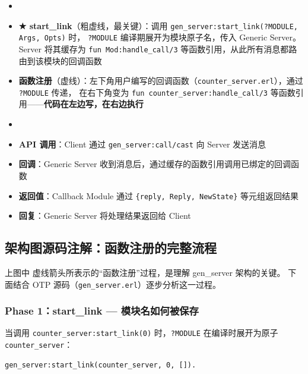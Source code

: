 \documentclass[a4paper,11pt]{article}
\begin{document}
\begin{notebox}[图中箭头说明]
\begin{itemize}[leftmargin=2em, itemsep=2pt]
    \item[\textbf{启动阶段}]~
    \item {} \textbf{★ start\_link}（粗虚线，最关键）：调用 \texttt{gen\_server:start\_link(?MODULE, Args, Opts)} 时，
          \texttt{?MODULE} 编译期展开为模块原子名，传入 Generic Server。Server 将其缓存为
          \texttt{fun Mod:handle\_call/3} 等函数引用，从此所有消息都路由到该模块的回调函数
    \item {} \textbf{函数注册}（虚线）：左下角用户编写的回调函数（\texttt{counter\_server.erl}），通过 \texttt{?MODULE} 传递，
          在右下角变为 \texttt{fun counter\_server:handle\_call/3} 等函数引用——\textbf{代码在左边写，在右边执行}
    \item[\textbf{运行阶段}]~
    \item {} \textbf{API 调用}：Client 通过 \texttt{gen\_server:call/cast} 向 Server 发送消息
    \item {} \textbf{回调}：Generic Server 收到消息后，通过缓存的函数引用调用已绑定的回调函数
    \item {} \textbf{返回值}：Callback Module 通过 \texttt{\{reply, Reply, NewState\}} 等元组返回结果
    \item {} \textbf{回复}：Generic Server 将处理结果返回给 Client
\end{itemize}
\end{notebox}

\subsection{架构图源码注解：函数注册的完整流程}
\label{subsec:arch-annotation}

上图中  虚线箭头所表示的``函数注册''过程，是理解 gen\_server 架构的关键。
下面结合 OTP 源码（\texttt{gen\_server.erl}）逐步分析这一过程。

\subsubsection{Phase 1：start\_link --- 模块名如何被保存}

当调用 \texttt{counter\_server:start\_link(0)} 时，\texttt{?MODULE} 在编译时展开为原子 \texttt{counter\_server}：

\begin{lstlisting}[style=erlangstyle, caption={start\_link 展开后的实际调用}]
gen_server:start_link(counter_server, 0, []).
\end{lstlisting}
\end{document}
